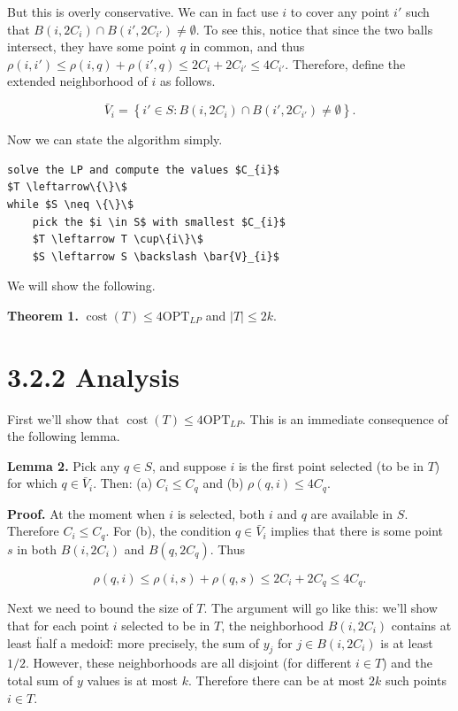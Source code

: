 \documentclass{article}
\begin{document}
But this is overly conservative. We can in fact use $i$ to cover any point $i'$ such that $B(i, 2 C_{i}) \cap B(i', 2 C_{i'}) \neq \emptyset$. To see this, notice that since the two balls intersect, they have some point $q$ in common, and thus $\rho(i, i') \leq \rho(i, q) + \rho(i', q) \leq 2 C_{i} + 2 C_{i'} \leq 4 C_{i'}$. Therefore, define the extended neighborhood of $i$ as follows.

\begin{equation*}
\bar{V}_{i} = \left\{i' \in S: B(i, 2 C_{i}) \cap B(i', 2 C_{i'}) \neq \emptyset\right\}.
\end{equation*}

Now we can state the algorithm simply.

\begin{verbatim}
solve the LP and compute the values $C_{i}$
$T \leftarrow\{\}\$
while $S \neq \{\}\$
    pick the $i \in S$ with smallest $C_{i}$
    $T \leftarrow T \cup\{i\}\$
    $S \leftarrow S \backslash \bar{V}_{i}$
\end{verbatim}

We will show the following.

\textbf{Theorem 1.} $\operatorname{cost}(T) \leq 4 \mathrm{OPT}_{LP}$ and $|T| \leq 2k$.

\section*{3.2.2 Analysis}

First we'll show that $\operatorname{cost}(T) \leq 4 \mathrm{OPT}_{LP}$. This is an immediate consequence of the following lemma.

\textbf{Lemma 2.} Pick any $q \in S$, and suppose $i$ is the first point selected (to be in $T$) for which $q \in \bar{V}_{i}$. Then: (a) $C_{i} \leq C_{q}$ and (b) $\rho(q, i) \leq 4 C_{q}$.

\textbf{Proof.} At the moment when $i$ is selected, both $i$ and $q$ are available in $S$. Therefore $C_{i} \leq C_{q}$. For (b), the condition $q \in \bar{V}_{i}$ implies that there is some point $s$ in both $B(i, 2 C_{i})$ and $B(q, 2 C_{q})$. Thus

\begin{equation*}
\rho(q, i) \leq \rho(i, s) + \rho(q, s) \leq 2 C_{i} + 2 C_{q} \leq 4 C_{q}.
\end{equation*}

Next we need to bound the size of $T$. The argument will go like this: we'll show that for each point $i$ selected to be in $T$, the neighborhood $B(i, 2 C_{i})$ contains at least \"half a medoid\": more precisely, the sum of $y_{j}$ for $j \in B(i, 2 C_{i})$ is at least $1/2$. However, these neighborhoods are all disjoint (for different $i \in T$) and the total sum of $y$ values is at most $k$. Therefore there can be at most $2k$ such points $i \in T$.
\end{document}
